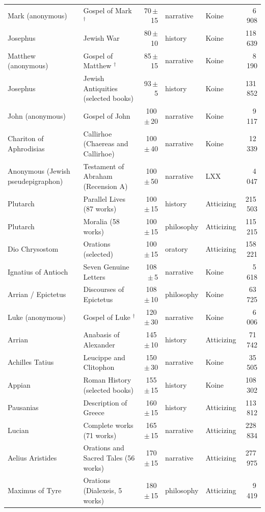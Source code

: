 \begin{longtable}{p{2.6cm}p{4.1cm}rll r}
Mark (anonymous) & Gospel of Mark $^{\dagger}$ & 70\,$\pm$\,15 & narrative & Koine & 6\,908 \\
Josephus & Jewish War & 80\,$\pm$\,10 & history & Koine & 118\,639 \\
Matthew (anonymous) & Gospel of Matthew $^{\dagger}$ & 85\,$\pm$\,15 & narrative & Koine & 8\,190 \\
Josephus & Jewish Antiquities (selected books) & 93\,$\pm$\,5 & history & Koine & 131\,852 \\
John (anonymous) & Gospel of John & 100\,$\pm$\,20 & narrative & Koine & 9\,117 \\
Chariton of Aphrodisias & Callirhoe (Chaereas and Callirhoe) & 100\,$\pm$\,40 & narrative & Koine & 12\,339 \\
Anonymous (Jewish pseudepigraphon) & Testament of Abraham (Recension A) & 100\,$\pm$\,50 & narrative & LXX & 4\,047 \\
Plutarch & Parallel Lives (87 works) & 100\,$\pm$\,15 & history & Atticizing & 215\,503 \\
Plutarch & Moralia (58 works) & 100\,$\pm$\,15 & philosophy & Atticizing & 115\,215 \\
Dio Chrysostom & Orations (selected) & 100\,$\pm$\,15 & oratory & Atticizing & 158\,221 \\
Ignatius of Antioch & Seven Genuine Letters & 108\,$\pm$\,5 & narrative & Koine & 5\,618 \\
Arrian / Epictetus & Discourses of Epictetus & 108\,$\pm$\,10 & philosophy & Koine & 63\,725 \\
Luke (anonymous) & Gospel of Luke $^{\dagger}$ & 120\,$\pm$\,30 & narrative & Koine & 6\,006 \\
Arrian & Anabasis of Alexander & 145\,$\pm$\,10 & history & Atticizing & 71\,742 \\
Achilles Tatius & Leucippe and Clitophon & 150\,$\pm$\,30 & narrative & Koine & 35\,505 \\
Appian & Roman History (selected books) & 155\,$\pm$\,15 & history & Koine & 108\,302 \\
Pausanias & Description of Greece & 160\,$\pm$\,15 & history & Atticizing & 113\,812 \\
Lucian & Complete works (71 works) & 165\,$\pm$\,15 & narrative & Atticizing & 228\,834 \\
Aelius Aristides & Orations and Sacred Tales (56 works) & 170\,$\pm$\,15 & narrative & Atticizing & 277\,975 \\
Maximus of Tyre & Orations (Dialexeis, 5 works) & 180\,$\pm$\,15 & philosophy & Atticizing & 9\,419 \\

\end{longtable}
